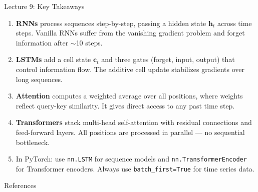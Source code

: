 \documentclass[aspectratio=169, 11pt]{beamer}
\begin{document}
\begin{frame}{Lecture 9: Key Takeaways}
  \begin{keybox}
    {\small
    \begin{enumerate}
      \item \textbf{RNNs} process sequences step-by-step, passing a hidden state $\mathbf{h}_t$
            across time steps. Vanilla RNNs suffer from the vanishing gradient problem
            and forget information after $\sim$10 steps.

      \item \textbf{LSTMs} add a cell state $\mathbf{c}_t$ and three gates (forget, input, output)
            that control information flow. The additive cell update stabilizes gradients
            over long sequences.

      \item \textbf{Attention} computes a weighted average over all positions, where weights
            reflect query-key similarity. It gives direct access to any past time step.

      \item \textbf{Transformers} stack multi-head self-attention with residual connections
            and feed-forward layers. All positions are processed in parallel ---
            no sequential bottleneck.

      \item In PyTorch: use \texttt{nn.LSTM} for sequence models and
            \texttt{nn.TransformerEncoder} for Transformer encoders.
            Always use \texttt{batch\_first=True} for time series data.
    \end{enumerate}
    }
  \end{keybox}
\end{frame}

\begin{frame}[allowframebreaks]{References}
  \printbibliography[heading=none]
\end{frame}

\end{document}
